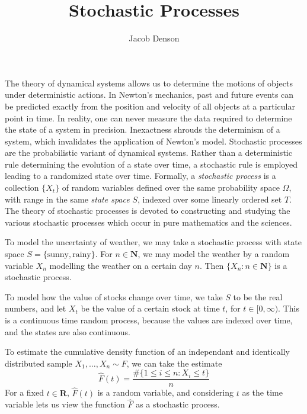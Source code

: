 

\title{Stochastic Processes}
\author{Jacob Denson}



\maketitle
\tableofcontents

\newpage


The theory of dynamical systems allows us to determine the motions of objects under deterministic actions. In Newton's mechanics, past and future events can be predicted exactly from the position and velocity of all objects at a particular point in time. In reality, one can never measure the data required to determine the state of a system in precision. Inexactness shrouds the determinism of a system, which invalidates the application of Newton's model. Stochastic processes are the probabilistic variant of dynamical systems. Rather than a deterministic rule determining the evolution of a state over time, a stochastic rule is employed leading to a randomized state over time. Formally, a \emph{stochastic process} is a collection $\{ X_t \}$ of random variables defined over the same probability space $\Omega$, with range in the same \emph{state space} $S$, indexed over some linearly ordered set $T$. The theory of stochastic processes is devoted to constructing and studying the various stochastic processes which occur in pure mathematics and the sciences.

\begin{example}
    To model the uncertainty of weather, we may take a stochastic process with state space $S = \{ \text{sunny}, \text{rainy} \}$. For $n \in \mathbf{N}$, we may model the weather by a random variable $X_n$ modelling the weather on a certain day $n$. Then $\{ X_n : n \in \mathbf{N} \}$ is a stochastic process.
\end{example}

\begin{example}
    To model how the value of stocks change over time, we take $S$ to be the real numbers, and let $X_t$ be the value of a certain stock at time $t$, for $t \in [0,\infty)$. This is a continuous time random process, because the values are indexed over time, and the states are also continuous.
\end{example}

\begin{example}
    To estimate the cumulative density function of an independant and identically distributed sample $X_1, \dots, X_n \sim F$, we can take the estimate
    \[ \widehat{F}(t) = \frac{\# \{ 1 \leq i \leq n : X_i \leq t \}}{n} \]
    For a fixed $t \in \mathbf{R}$, $\widehat{F}(t)$ is a random variable, and considering $t$ as the time variable lets us view the function $\widehat{F}$ as a stochastic process.
\end{example}

